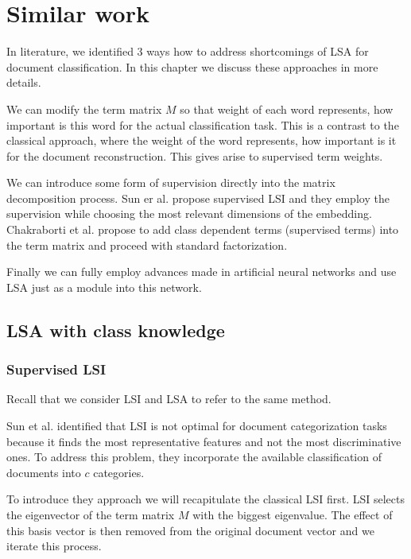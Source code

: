 \chapter{Similar work}
In literature, we identified $3$ ways how to address shortcomings of LSA for document classification. In this chapter we discuss these approaches in more details.

We can modify the term matrix $M$ so that weight of each word represents, how important is this word for the actual classification task. 
This is a contrast to the classical approach, where the weight of the word represents, how important is it for the document reconstruction.
This gives arise to supervised term weights.

We can introduce some form of supervision directly into the matrix decomposition process.
Sun er al. \cite{sun2004supervised} propose supervised LSI and they employ the supervision while choosing the most relevant dimensions of the embedding.
Chakraborti et al. \cite{chakraborti2006sprinkling} propose to add class dependent terms (supervised terms) into the term matrix and proceed with standard factorization.

Finally we can fully employ advances made in artificial neural networks and use LSA just as a module into this network.


\section{LSA with class knowledge} \label{sec:superwisedlsa}
    \subsection{Supervised LSI}
        Recall that we consider LSI and LSA to refer to the same method. 
    
        Sun et al. \cite{sun2004supervised} %
        identified that LSI is not optimal for document categorization tasks because it finds the most representative features and not the most discriminative ones. 
        To address this problem, they incorporate the available classification of documents into $c$ categories. 
        
        To introduce they approach we will recapitulate the classical LSI first. 
        LSI selects the eigenvector of the term matrix $M$ with the biggest eigenvalue.
        The effect of this basis vector is then removed from the original document vector and we iterate this process. 
        
